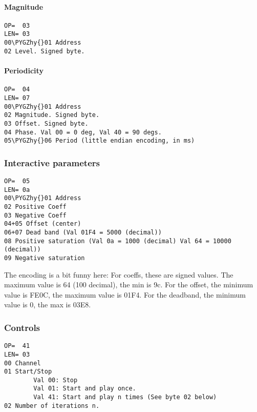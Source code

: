 \documentclass[a4paper,8pt,english]{sphinxmanual}
\def\PYGZhy{\char`\-}
\begin{document}
\paragraph{Magnitude}
\label{input/devices/iforce-protocol:magnitude}
\begin{Verbatim}[commandchars=\\\{\}]
OP=  03
LEN= 03
00\PYGZhy{}01 Address
02 Level. Signed byte.
\end{Verbatim}


\paragraph{Periodicity}
\label{input/devices/iforce-protocol:periodicity}
\begin{Verbatim}[commandchars=\\\{\}]
OP=  04
LEN= 07
00\PYGZhy{}01 Address
02 Magnitude. Signed byte.
03 Offset. Signed byte.
04 Phase. Val 00 = 0 deg, Val 40 = 90 degs.
05\PYGZhy{}06 Period (little endian encoding, in ms)
\end{Verbatim}


\subsubsection{Interactive parameters}
\label{input/devices/iforce-protocol:interactive-parameters}
\begin{Verbatim}[commandchars=\\\{\}]
OP=  05
LEN= 0a
00\PYGZhy{}01 Address
02 Positive Coeff
03 Negative Coeff
04+05 Offset (center)
06+07 Dead band (Val 01F4 = 5000 (decimal))
08 Positive saturation (Val 0a = 1000 (decimal) Val 64 = 10000 (decimal))
09 Negative saturation
\end{Verbatim}

The encoding is a bit funny here: For coeffs, these are signed values. The
maximum value is 64 (100 decimal), the min is 9c.
For the offset, the minimum value is FE0C, the maximum value is 01F4.
For the deadband, the minimum value is 0, the max is 03E8.


\subsubsection{Controls}
\label{input/devices/iforce-protocol:controls}
\begin{Verbatim}[commandchars=\\\{\}]
OP=  41
LEN= 03
00 Channel
01 Start/Stop
        Val 00: Stop
        Val 01: Start and play once.
        Val 41: Start and play n times (See byte 02 below)
02 Number of iterations n.
\end{Verbatim}
\end{document}
